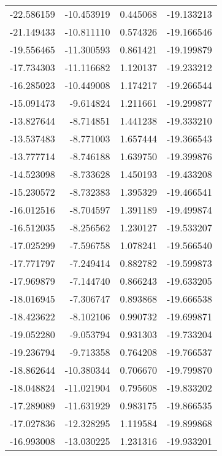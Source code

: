 \begin{tabular}{rrrr}
      -22.586159 &       -10.453919 &    0.445068 & -19.133213 \\
      -21.149433 &       -10.811110 &    0.574326 & -19.166546 \\
      -19.556465 &       -11.300593 &    0.861421 & -19.199879 \\
      -17.734303 &       -11.116682 &    1.120137 & -19.233212 \\
      -16.285023 &       -10.449008 &    1.174217 & -19.266544 \\
      -15.091473 &        -9.614824 &    1.211661 & -19.299877 \\
      -13.827644 &        -8.714851 &    1.441238 & -19.333210 \\
      -13.537483 &        -8.771003 &    1.657444 & -19.366543 \\
      -13.777714 &        -8.746188 &    1.639750 & -19.399876 \\
      -14.523098 &        -8.733628 &    1.450193 & -19.433208 \\
      -15.230572 &        -8.732383 &    1.395329 & -19.466541 \\
      -16.012516 &        -8.704597 &    1.391189 & -19.499874 \\
      -16.512035 &        -8.256562 &    1.230127 & -19.533207 \\
      -17.025299 &        -7.596758 &    1.078241 & -19.566540 \\
      -17.771797 &        -7.249414 &    0.882782 & -19.599873 \\
      -17.969879 &        -7.144740 &    0.866243 & -19.633205 \\
      -18.016945 &        -7.306747 &    0.893868 & -19.666538 \\
      -18.423622 &        -8.102106 &    0.990732 & -19.699871 \\
      -19.052280 &        -9.053794 &    0.931303 & -19.733204 \\
      -19.236794 &        -9.713358 &    0.764208 & -19.766537 \\
      -18.862644 &       -10.380344 &    0.706670 & -19.799870 \\
      -18.048824 &       -11.021904 &    0.795608 & -19.833202 \\
      -17.289089 &       -11.631929 &    0.983175 & -19.866535 \\
      -17.027836 &       -12.328295 &    1.119584 & -19.899868 \\
      -16.993008 &       -13.030225 &    1.231316 & -19.933201 \\

\end{tabular}
